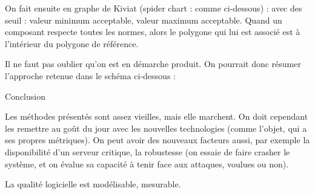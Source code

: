 On fait ensuite en graphe de Kiviat (spider chart : comme ci-dessous) :
avec des seuil : valeur minimum acceptable, valeur maximum acceptable. Quand un composant respecte toutes les normes, alors le polygone qui lui est associé est à l’intérieur du polygone de référence.

Il ne faut pas oublier qu’on est en démarche produit. On pourrait donc résumer l’approche retenue dans le schéma ci-dessous :


Conclusion

Les méthodes présentés sont assez vieilles, mais elle marchent. On doit cependant les remettre au goût du jour avec les nouvelles technologies (comme l’objet, qui a ses propres métriques).
On peut avoir des nouveaux facteurs aussi, par exemple la disponibilité d’un serveur critique, la robustesse (on essaie de faire crasher le système, et on évalue sa capacité à tenir face aux attaques, voulues ou non).

La qualité logicielle est modélisable, mesurable.
